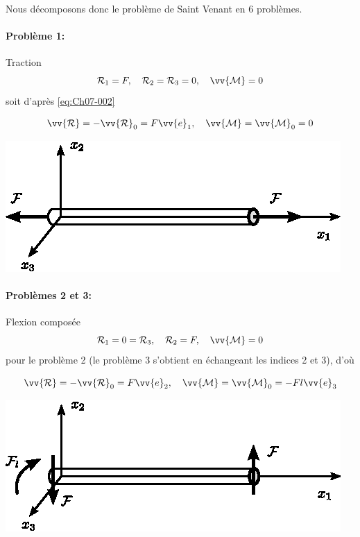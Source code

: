 Nous décomposons donc le problème de Saint Venant en 6 problèmes.
\paragraph{Problème 1:} Traction
\begin{equation}
    \mathcal{R}_1 = F, \quad \mathcal{R}_2 = \mathcal{R}_3 = 0, \quad \vv{\mathcal{M}} = 0
    \label{eq:Ch07-009}
\end{equation}
soit d'après \eqref{eq:Ch07-002}
\begin{multicols}{2}
    \begin{equation*}
        \vv{\mathcal{R}} = -\vv{\mathcal{R}}_0 = F \vv{e}_1, \quad \vv{\mathcal{M}} = \vv{\mathcal{M}}_0 = 0
    \end{equation*}
    \columnbreak
    \begin{center}
        \includegraphics{../images/T1_Ch07-02}
    \end{center}
\end{multicols}
\paragraph{Problèmes 2 et 3:} Flexion composée
\begin{equation}
    \mathcal{R}_1 = 0 = \mathcal{R}_3, \quad \mathcal{R}_2 = F, \quad \vv{\mathcal{M}} = 0
    \label{eq:Ch07-010}
\end{equation}
pour le problème 2 (le problème 3 s'obtient en échangeant les indices 2 et 3), d'où
\begin{multicols}{2}
    \begin{equation*}
        \vv{\mathcal{R}} = -\vv{\mathcal{R}}_0 = F \vv{e}_2, \quad \vv{\mathcal{M}} = \vv{\mathcal{M}}_0 = -F l \vv{e}_3
    \end{equation*}
    \columnbreak
    \begin{center}
        \includegraphics{../images/T1_Ch07-03}
    \end{center}
\end{multicols}

